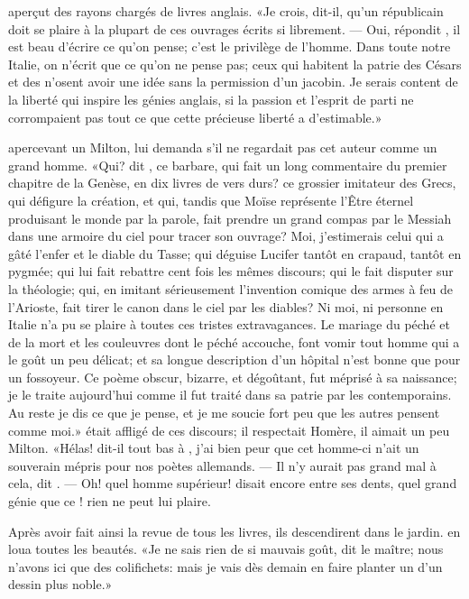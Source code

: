  aperçut des rayons chargés de livres anglais. «Je crois, dit-il,
qu’un républicain doit se plaire à la plupart de ces ouvrages écrits si
librement. — Oui, répondit , il est beau d’écrire ce qu’on
pense; c’est le privilège de l’homme. Dans toute notre Italie, on
n’écrit que ce qu’on ne pense pas; ceux qui habitent la patrie des
Césars et des  n’osent avoir une idée sans la permission d’un
jacobin. Je serais content de la liberté qui inspire les génies
anglais, si la passion et l’esprit de parti ne corrompaient pas tout ce
que cette précieuse liberté a d’estimable.»

 apercevant un Milton, lui demanda s’il ne regardait pas cet
auteur comme un grand homme. «Qui? dit , ce barbare, qui fait
un long commentaire du premier chapitre de la Genèse, en dix livres de
vers durs? ce grossier imitateur des Grecs, qui défigure la création,
et qui, tandis que Moïse représente l’Être éternel produisant le monde
par la parole, fait prendre un grand compas par le Messiah dans une
armoire du ciel pour tracer son ouvrage? Moi, j’estimerais celui qui a
gâté l’enfer et le diable du Tasse; qui déguise Lucifer tantôt en
crapaud, tantôt en pygmée; qui lui fait rebattre cent fois les mêmes
discours; qui le fait disputer sur la théologie; qui, en imitant
sérieusement l’invention comique des armes à feu de l’Arioste, fait
tirer le canon dans le ciel par les diables? Ni moi, ni personne en
Italie n’a pu se plaire à toutes ces tristes extravagances. Le mariage
du péché et de la mort et les couleuvres dont le péché accouche, font
vomir tout homme qui a le goût un peu délicat; et sa longue description
d’un hôpital n’est bonne que pour un fossoyeur. Ce poème obscur,
bizarre, et dégoûtant, fut méprisé à sa naissance; je le traite
aujourd’hui comme il fut traité dans sa patrie par les
contemporains. Au reste je dis ce que je pense, et je me soucie fort
peu que les autres pensent comme moi.»  était affligé de ces
discours; il respectait Homère, il aimait un peu Milton. «Hélas! dit-il
tout bas à , j’ai bien peur que cet homme-ci n’ait un souverain
mépris pour nos poètes allemands. — Il n’y aurait pas grand mal à cela,
dit . — Oh! quel homme supérieur! disait encore  entre ses
dents, quel grand génie que ce ! rien ne peut lui plaire.



Après avoir fait ainsi la revue de tous les livres, ils descendirent
dans le jardin.  en loua toutes les beautés. «Je ne sais rien de
si mauvais goût, dit le maître; nous n’avons ici que des colifichets:
mais je vais dès demain en faire planter un d’un dessin plus noble.»


